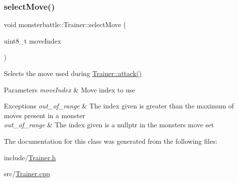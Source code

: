 \subsubsection{\texorpdfstring{select\+Move()}{selectMove()}}
{\footnotesize\ttfamily void monsterbattle\+::\+Trainer\+::select\+Move (\begin{DoxyParamCaption}\item[{uint8\+\_\+t}]{move\+Index }\end{DoxyParamCaption})}



Selects the move used during \hyperlink{classmonsterbattle_1_1Trainer_ac15af2a463e8241ac432f81b1b64e015}{Trainer\+::attack()} 


\begin{DoxyParams}{Parameters}
{\em move\+Index} & Move index to use\\
\hline
\end{DoxyParams}

\begin{DoxyExceptions}{Exceptions}
{\em out\+\_\+of\+\_\+range} & The index given is greater than the maximum of moves present in a monster \\
\hline
{\em out\+\_\+of\+\_\+range} & The index given is a nullptr in the monster\textquotesingle{}s move set \\
\hline
\end{DoxyExceptions}


The documentation for this class was generated from the following files\+:\begin{DoxyCompactItemize}
\item 
include/\hyperlink{Trainer_8h}{Trainer.\+h}\item 
src/\hyperlink{Trainer_8cpp}{Trainer.\+cpp}\end{DoxyCompactItemize}
